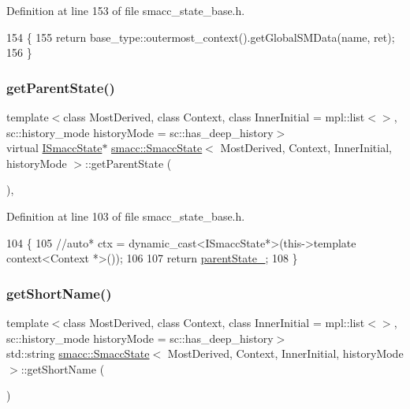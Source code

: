 Definition at line 153 of file smacc\+\_\+state\+\_\+base.\+h.


\begin{DoxyCode}
154   \{
155     \textcolor{keywordflow}{return} base\_type::outermost\_context().getGlobalSMData(name, ret);
156   \}
\end{DoxyCode}
\mbox{\label{classsmacc_1_1SmaccState_a69fc0aa1dbe0c00501f2890616225004}} 
\subsubsection{\texorpdfstring{get\+Parent\+State()}{getParentState()}}
{\footnotesize\ttfamily template$<$class Most\+Derived, class Context, class Inner\+Initial = mpl\+::list$<$$>$, sc\+::history\+\_\+mode history\+Mode = sc\+::has\+\_\+deep\+\_\+history$>$ \\
virtual \hyperlink{classsmacc_1_1ISmaccState}{I\+Smacc\+State}$\ast$ \hyperlink{classsmacc_1_1SmaccState}{smacc\+::\+Smacc\+State}$<$ Most\+Derived, Context, Inner\+Initial, history\+Mode $>$\+::get\+Parent\+State (\begin{DoxyParamCaption}{ }\end{DoxyParamCaption})\hspace{0.3cm}{\ttfamily [inline]}, {\ttfamily [virtual]}}



Definition at line 103 of file smacc\+\_\+state\+\_\+base.\+h.


\begin{DoxyCode}
104   \{
105     \textcolor{comment}{//auto* ctx = dynamic\_cast<ISmaccState*>(this->template context<Context *>());}
106 
107     \textcolor{keywordflow}{return} \hyperlink{classsmacc_1_1ISmaccState_ad61db41d8d06a836e7d1dac7767f5695}{parentState\_};
108   \}
\end{DoxyCode}
\mbox{\label{classsmacc_1_1SmaccState_a4db028a85244653e48957d2b3371413d}} 
\subsubsection{\texorpdfstring{get\+Short\+Name()}{getShortName()}}
{\footnotesize\ttfamily template$<$class Most\+Derived, class Context, class Inner\+Initial = mpl\+::list$<$$>$, sc\+::history\+\_\+mode history\+Mode = sc\+::has\+\_\+deep\+\_\+history$>$ \\
std\+::string \hyperlink{classsmacc_1_1SmaccState}{smacc\+::\+Smacc\+State}$<$ Most\+Derived, Context, Inner\+Initial, history\+Mode $>$\+::get\+Short\+Name (\begin{DoxyParamCaption}{ }\end{DoxyParamCaption})\hspace{0.3cm}{\ttfamily [inline]}}



